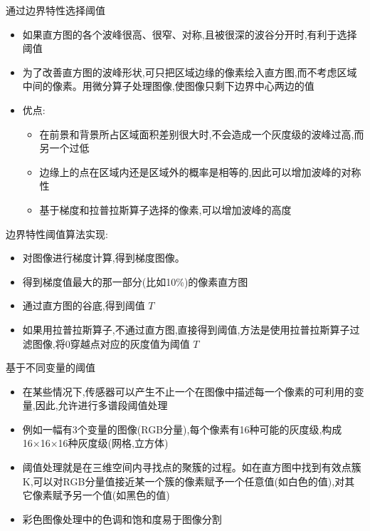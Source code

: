 \documentclass[presentation]{beamer}
\begin{document}
\begin{frame}[label={sec:orgd906c0d}]{通过边界特性选择阈值}
\begin{itemize}
\item 如果直方图的各个波峰很高、很窄、对称,且被很深的波谷分开时,有利于选择阈值
\item 为了改善直方图的波峰形状,可只把区域边缘的像素绘入直方图,而不考虑区域中间的像素。用微分算子处理图像,使图像只剩下边界中心两边的值
\item 优点:
\begin{itemize}
\item 在前景和背景所占区域面积差别很大时,不会造成一个灰度级的波峰过高,而另一个过低
\item 边缘上的点在区域内还是区域外的概率是相等的,因此可以增加波峰的对称性
\item 基于梯度和拉普拉斯算子选择的像素,可以增加波峰的高度
\end{itemize}
\end{itemize}
\end{frame}

\begin{frame}[label={sec:org8d7651a}]{边界特性阈值算法实现:}
\begin{itemize}
\item 对图像进行梯度计算,得到梯度图像。
\item 得到梯度值最大的那一部分(比如10\%)的像素直方图
\item 通过直方图的谷底,得到阈值 \(T\)
\item 如果用拉普拉斯算子,不通过直方图,直接得到阈值,方法是使用拉普拉斯算子过滤图像,将0穿越点对应的灰度值为阈值 \(T\)
\end{itemize}
\end{frame}

\begin{frame}[label={sec:org0da0b55}]{基于不同变量的阈值}
\begin{itemize}
\item 在某些情况下,传感器可以产生不止一个在图像中描述每一个像素的可利用的变量,因此,允许进行多谱段阈值处理
\item 例如一幅有3个变量的图像(RGB分量),每个像素有16种可能的灰度级,构成16×16×16种灰度级(网格,立方体)
\item 阈值处理就是在三维空间内寻找点的聚簇的过程。如在直方图中找到有效点簇K,可以对RGB分量值接近某一个簇的像素赋予一个任意值(如白色的值),对其它像素赋予另一个值(如黑色的值)
\item 彩色图像处理中的色调和饱和度易于图像分割
\end{itemize}
\end{frame}
\end{document}
